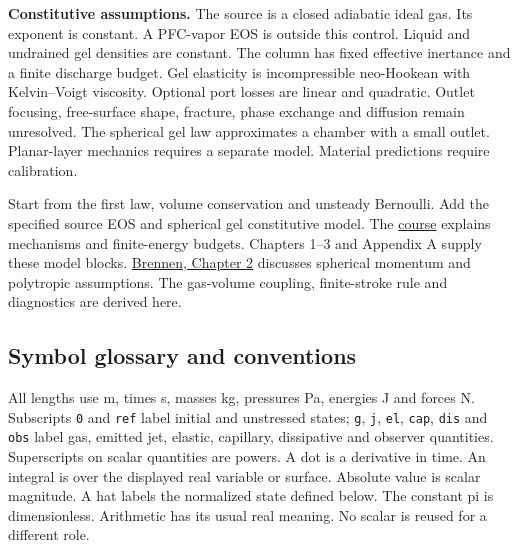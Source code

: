 \documentclass[11pt]{article}
\begin{document}
\textbf{Constitutive assumptions.} The source is a closed adiabatic ideal gas. Its exponent is constant. A PFC-vapor EOS is outside this control. Liquid and undrained gel densities are constant. The column has fixed effective inertance and a finite discharge budget. Gel elasticity is incompressible neo-Hookean with Kelvin–Voigt viscosity. Optional port losses are linear and quadratic. Outlet focusing, free-surface shape, fracture, phase exchange and diffusion remain unresolved. The spherical gel law approximates a chamber with a small outlet. Planar-layer mechanics requires a separate model. Material predictions require calibration.


Start from the first law, volume conservation and unsteady Bernoulli. Add the specified source EOS and spherical gel constitutive model. The \href{https://pfgaophilip.github.io/Laser-Induced-PFC-Droplet-TP/}{course} explains mechanisms and finite-energy budgets. Chapters 1–3 and Appendix A supply these model blocks. \href{https://media.library.caltech.edu/CaltechBOOK:1995.001/chap2.htm}{Brennen, Chapter 2} discusses spherical momentum and polytropic assumptions. The gas-volume coupling, finite-stroke rule and diagnostics are derived here.



\subsection*{Symbol glossary and conventions}

All lengths use m, times s, masses kg, pressures Pa, energies J and forces N. Subscripts \texttt{0} and \texttt{ref} label initial and unstressed states; \texttt{g}, \texttt{j}, \texttt{el}, \texttt{cap}, \texttt{dis} and \texttt{obs} label gas, emitted jet, elastic, capillary, dissipative and observer quantities. Superscripts on scalar quantities are powers. A dot is a derivative in time. An integral is over the displayed real variable or surface. Absolute value is scalar magnitude. A hat labels the normalized state defined below. The constant pi is dimensionless. Arithmetic has its usual real meaning. No scalar is reused for a different role.
\end{document}
